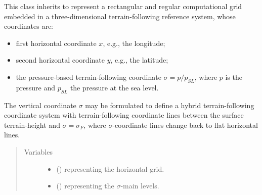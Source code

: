 \documentclass[letterpaper,10pt,english]{sphinxmanual}
\begin{document}

\begin{fulllineitems}
\label{\detokenize{api:tasmania.grids.sigma.Sigma3d}}
This class inherits {\hyperref[\detokenize{api:tasmania.grids.grid_xyz.GridXYZ}]{}} to represent a rectangular and regular computational grid
embedded in a three-dimensional terrain-following reference system, whose coordinates are:
\begin{itemize}
\item {} 
first horizontal coordinate \(x\), e.g., the longitude;

\item {} 
second horizontal coordinate \(y\), e.g., the latitude;

\item {} 
the pressure-based terrain-following coordinate \(\sigma = p / p_{SL}\),                  where \(p\) is the pressure and \(p_{SL}\) the pressure at the sea level.

\end{itemize}

The vertical coordinate \(\sigma\) may be formulated to define a hybrid terrain-following coordinate system
with terrain-following coordinate lines between the surface terrain-height and \(\sigma = \sigma_F\), where
\(\sigma\)-coordinate lines change back to flat horizontal lines.
\begin{quote}\begin{description}
\item[{Variables}] \leavevmode\begin{itemize}
\item {} 
 () \textendash{} {\hyperref[\detokenize{api:tasmania.grids.grid_xy.GridXY}]{}} representing the horizontal grid.

\item {} 
 () \textendash{} {\hyperref[\detokenize{api:tasmania.grids.axis.Axis}]{}} representing the \(\sigma\)-main levels.


\end{itemize}
\end{description}
\end{quote}
\end{fulllineitems}
\end{document}

